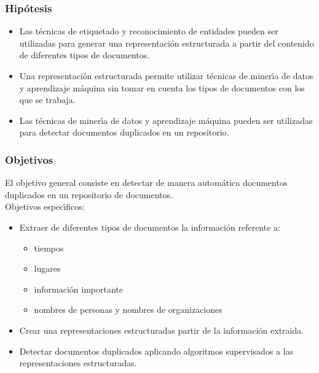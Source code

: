 \documentclass{beamer}
\begin{document}
\begin{frame}
  \frametitle{Hip\'{o}tesis}
  \begin{itemize}
  \item Las t\'{e}cnicas de etiquetado y reconocimiento de entidades pueden ser utilizadas para generar una representaci\'{o}n estructurada a partir del contenido de diferentes tipos de documentos.\\
    \vspace{2mm}
  \item Una representaci\'{o}n estructurada permite utilizar t\'{e}cnicas de miner\'{\i}a de datos y aprendizaje m\'{a}quina sin tomar en cuenta los tipos de documentos con los que se trabaja.
    \vspace{2mm}
  \item Las t\'{e}cnicas de miner\'{\i}a de datos y aprendizaje m\'{a}quina pueden ser utilizadas para detectar documentos duplicados en un repositorio.
  \end{itemize}
\end{frame}
\begin{frame}
  \frametitle{Objetivos}
  El objetivo general consiste en detectar de manera autom\'{a}tica documentos duplicados en un repositorio de documentos.\\
  \vspace{2mm}
  Objetivos espec\'{\i}ficos:
   \begin{itemize}
  \item Extraer de diferentes tipos de documentos la informaci\'{o}n referente a:
    \begin{itemize}
      \item tiempos
      \item lugares
      \item informaci\'{o}n importante
      \item nombres de personas y nombres de organizaciones
    \end{itemize}
  \item Crear una representaciones estructuradas partir de la informaci\'{o}n extraida. 
  \item Detectar documentos duplicados aplicando algoritmos supervisados a las representaciones estructuradas.
  \end{itemize}
\end{frame}
\end{document}
